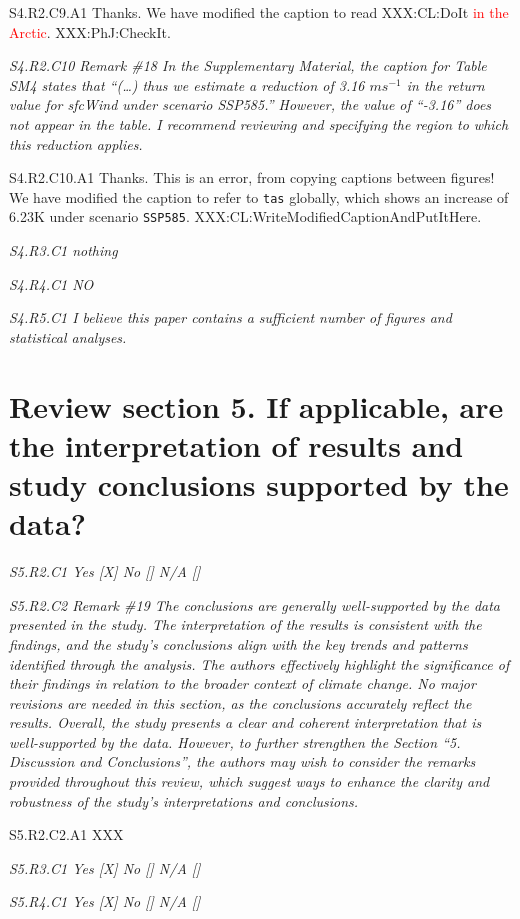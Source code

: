\documentclass[a4paper,10pt]{article}
\newcommand{\ed}[1]{\textcolor{red}{#1}}
\providecommand{\TA}{\texttt{tas}\xspace}
\providecommand{\SH}{\texttt{SSP585}\xspace}
\begin{document}
	S4.R2.C9.A1 Thanks. We have modified the caption to read XXX:CL:DoIt \ed{in the Arctic}. XXX:PhJ:CheckIt.

	\emph{S4.R2.C10 Remark \#18 In the Supplementary Material, the caption for Table SM4 states that “(…) thus we estimate a reduction of 3.16 $ms^{-1}$ in the return value for sfcWind under scenario SSP585.” However, the value of “-3.16” does not appear in the table. I recommend reviewing and specifying the region to which this reduction applies.}

	S4.R2.C10.A1 Thanks. This is an error, from copying captions between figures! We have modified the caption to refer to \TA globally, which shows an increase of 6.23K under scenario \SH. XXX:CL:WriteModifiedCaptionAndPutItHere.

	\emph{S4.R3.C1 nothing}

	\emph{S4.R4.C1 NO}

	\emph{S4.R5.C1 I believe this paper contains a sufficient number of figures and statistical analyses.}

	\section*{Review section 5. If applicable, are the interpretation of results and study conclusions supported by the data?}

	\emph{S5.R2.C1 Yes [X] No [] N/A []}

	\emph{S5.R2.C2 Remark \#19 The conclusions are generally well-supported by the data presented in the study. The interpretation of the results is consistent with the findings, and the study’s conclusions align with the key trends and patterns identified through the analysis. The authors effectively highlight the significance of their findings in relation to the broader context of climate change. No major revisions are needed in this section, as the conclusions accurately reflect the results. Overall, the study presents a clear and coherent interpretation that is well-supported by the data. However, to further strengthen the Section “5. Discussion and Conclusions”, the authors may wish to consider the remarks provided throughout this review, which suggest ways to enhance the clarity and robustness of the study’s interpretations and conclusions.}

	S5.R2.C2.A1 XXX

	\emph{S5.R3.C1 Yes [X] No [] N/A []}

	\emph{S5.R4.C1 Yes [X] No [] N/A []}
\end{document}
